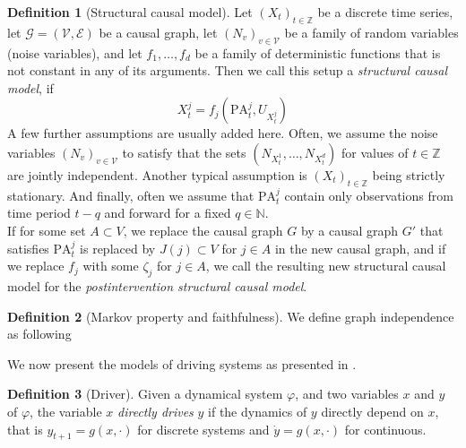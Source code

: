 \documentclass[11pt, a4paper]{memoir}
\theoremstyle{plain}
\theoremstyle{definition}
\newtheorem{defn}{Definition}
\newcommand{\mN}{\mathbb{N}}
\newcommand{\mZ}{\mathbb{Z}}
\begin{document}
\begin{defn}[Structural causal model]
Let $(X_t)_{t\in \mZ}$ be a discrete time series, let $\mathcal{G}=(\mathcal{V},\mathcal{E})$ be a causal graph, let $(N_v)_{v\in \mathcal{V}}$ be a family of random variables (noise variables), and let $f_1,\ldots,f_d$ be a family of deterministic functions that is not constant in any of its arguments. Then we call this setup a \emph{structural causal model}, if
$$X_t^j=f_j(\text{PA}_t^j,U_{X_{t}^j})$$
A few further assumptions are usually added here. Often, we assume the noise variables $(N_v)_{v\in \mathcal{V}}$ to satisfy that the sets $(N_{X_t^1},\ldots,N_{X_t^{d}})$ for values of $t\in \mZ$ are jointly independent. Another typical assumption is $(X_t)_{t\in \mZ}$ being strictly stationary. And finally, often we assume that $\text{PA}_t^j$ contain only observations from time period $t-q$ and forward for a fixed $q\in \mN$.\\
If for some set $A\subset V$, we replace the causal graph $G$ by a causal graph $G'$ that satisfies $\text{PA}_t^j$ is replaced by $J(j)\subset V$ for $j\in A$ in the new causal graph, and if we replace $f_j$ with some $\zeta_j$ for $j\in A$, we call the resulting new structural causal model for the \textit{postintervention structural causal model}.
\end{defn}

\begin{defn}[Markov property and faithfulness]
We define graph independence as following
\end{defn}




We now present the models of driving systems as presented in \cite{mathFound}.
\begin{defn}[Driver]
Given a dynamical system $\varphi$, and two variables $x$ and $y$ of $\varphi$, the variable $x$ \emph{directly drives} $y$ if the dynamics of $y$ directly depend on $x$, that is $y_{t+1}=g(x,\cdot)$ for discrete systems and $\dot{y}=g(x,\cdot)$ for continuous.
\end{defn}
\end{document}
